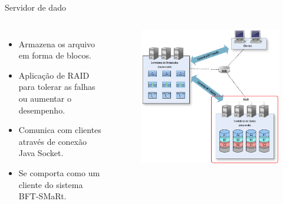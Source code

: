 \begin{frame}{Servidor de dado}
	
	\begin{columns}
		\begin{itemize}
			\item Armazena os arquivo em forma de blocos.
			\item Aplicação de RAID para tolerar as falhas ou aumentar o desempenho.
			\item Comunica com clientes através de conexão Java Socket.
			\item Se comporta como um cliente do sistema BFT-SMaRt.
		\end{itemize}
		
		\begin{figure}
			\includegraphics[width=\textwidth]{imagens/visao_geral2}
		\end{figure}
	\end{columns}
\end{frame}


